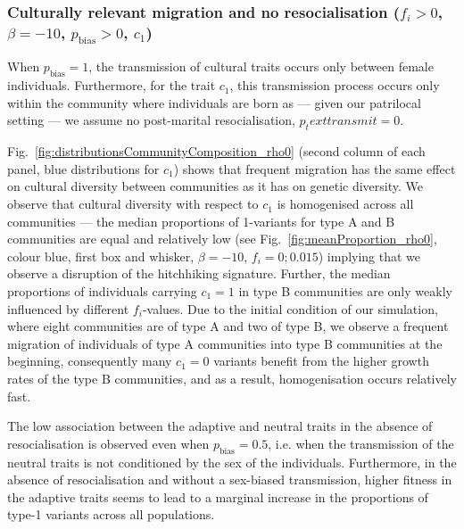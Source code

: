 \documentclass[9pt,twocolumn,twoside,lineno]{pnas-new}
\begin{document}
\subsubsection*{Culturally relevant migration and no resocialisation ($f_i>0$, $\beta=-10$, $p_\text{bias}>0$, $c_1$)}

When $p_\text{bias}=1$, the transmission of cultural traits occurs only between female individuals. Furthermore, for the trait $c_1$, this transmission process occurs only within the community where individuals are born as --- given our patrilocal setting --- we assume no post-marital resocialisation, $p_text{transmit}=0$.

Fig.~\ref{fig:distributionsCommunityComposition_rho0} (second column of each panel, blue distributions for $c_1$) shows that frequent migration has the same effect on cultural diversity between communities as it has on genetic diversity. We observe that cultural diversity with respect to $c_1$ is homogenised across all communities --- the median proportions of 1-variants for type A and B communities are equal and relatively low (see Fig.~\ref{fig:meanProportion_rho0}, colour blue, first box and whisker, $\beta=-10$, $f_i=0;0.015$) implying that we observe a disruption of the hitchhiking signature.
Further, the median proportions of individuals carrying $c_1=1$ in type B communities are only weakly influenced by different $f_i$-values. Due to the initial condition of our simulation, where eight communities are of type A and two of type B, we observe a frequent migration of individuals of type A communities into type B communities at the beginning, consequently many $c_1 = 0$ variants benefit from the higher growth rates of the type B communities, and as a result, homogenisation occurs relatively fast.  

The low association between the adaptive and neutral traits in the absence of resocialisation is observed even when $p_\text{bias}=0.5$, i.e. when the transmission of the neutral traits is not conditioned by the sex of the individuals. 
Furthermore, in the absence of resocialisation and without a sex-biased transmission, higher fitness in the adaptive traits seems to lead to a marginal increase in the proportions of type-1 variants across all populations. 
\end{document}
